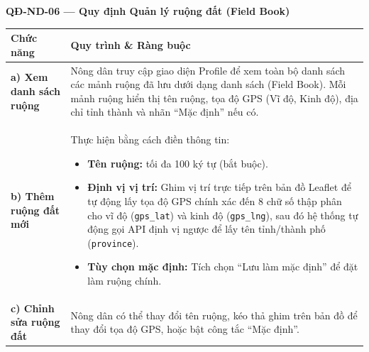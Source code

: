 \documentclass[12pt,a4paper]{article}
\begin{document}
\vspace{0.3cm}
\noindent\textbf{QĐ-ND-06 --- Quy định Quản lý ruộng đất (Field Book)}

\begin{longtable}{|
        >{\raggedright\arraybackslash}p{2.8cm}|
        >{\raggedright\arraybackslash}p{12cm}|}
    \hline
    \rowcolor{headerblue}
    \textbf{Chức năng}                   & \textbf{Quy trình \& Ràng buộc}                                                                                                                                                                                                                                                                                                  \\
    \hline
    \endhead
    \textbf{a) Xem danh sách ruộng}      &
    Nông dân truy cập giao diện Profile để xem toàn bộ danh sách các mảnh ruộng đã lưu dưới dạng danh sách (Field Book). Mỗi mảnh ruộng hiển thị tên ruộng, tọa độ GPS (Vĩ độ, Kinh độ), địa chỉ tỉnh thành và nhãn ``Mặc định'' nếu có.                                                                                                                                    \\
    \hline
    \textbf{b) Thêm ruộng đất mới}       &
    Thực hiện bằng cách điền thông tin:
    \begin{itemize}[leftmargin=*,topsep=2pt,itemsep=1pt]
        \item \textbf{Tên ruộng:} tối đa 100 ký tự (bắt buộc).
        \item \textbf{Định vị vị trí:} Ghim vị trí trực tiếp trên bản đồ Leaflet để tự động lấy tọa độ GPS chính xác đến 8 chữ số thập phân cho vĩ độ (\texttt{gps\_lat}) và kinh độ (\texttt{gps\_lng}), sau đó hệ thống tự động gọi API định vị ngược để lấy tên tỉnh/thành phố (\texttt{province}).
        \item \textbf{Tùy chọn mặc định:} Tích chọn ``Lưu làm mặc định'' để đặt làm ruộng chính.
    \end{itemize}                                                                       \\
    \hline
    \textbf{c) Chỉnh sửa ruộng đất}      &
    Nông dân có thể thay đổi tên ruộng, kéo thả ghim trên bản đồ để thay đổi tọa độ GPS, hoặc bật công tắc ``Mặc định''.                                                                                                                                                                                                                                                    \\

\end{longtable}
\end{document}
